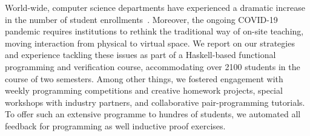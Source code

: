 World-wide, computer science departments have experienced a dramatic increase in the number of student enrollments~\citep{comp_sci_growth1,comp_sci_growth2}.
Moreover, the ongoing COVID-19 pandemic requires institutions to rethink the traditional way of on-site teaching,
moving interaction from physical to virtual space.
We report on our strategies and experience tackling these issues
as part of a Haskell-based functional programming and verification course,
accommodating  over 2100 students in the course of two semesters.
Among other things,
we fostered engagement with weekly programming competitions
and creative homework projects,
special workshops with industry partners,
and collaborative pair-programming tutorials.
To offer such an extensive programme to hundres of students,
we automated all feedback for programming as well
inductive proof exercises.

